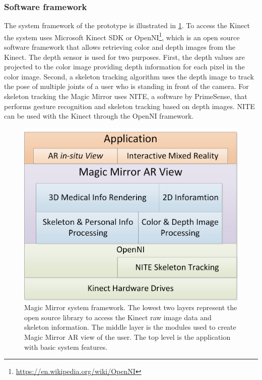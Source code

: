 \subsubsection{Software framework}
The system framework of the prototype is illustrated in \figurename{\ref{fig:3-MMC:systemFramework}}.
To access the Kinect the system uses Microsoft Kinect SDK or OpenNI\footnote{\url{https://en.wikipedia.org/wiki/OpenNI}}, which is an open source software framework that allows retrieving color and depth images from the Kinect. The depth sensor is used for two purposes. First, the depth values are projected to the color image providing depth information for each pixel in the color image. Second, a skeleton tracking algorithm uses the depth image to track the pose of multiple joints of a user who is standing in front of the camera. For skeleton tracking the Magic Mirror uses NITE, a software by PrimeSense, that performs gesture recognition and skeleton tracking based on depth images. NITE can be used with the Kinect through the OpenNI framework.
\begin{figure}
	\centering
	\includegraphics[width = 0.7\linewidth]{figures/3-MMC/SystemFramework}
	\caption[Magic Mirror system framework]{Magic Mirror system framework. The lowest two layers represent the open source library to access the Kinect raw image data and skeleton information. The middle layer is the modules used to create Magic Mirror AR view of the user. The top level is the application with basic system features.}
	\label{fig:3-MMC:systemFramework}
\end{figure}


